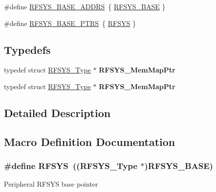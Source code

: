 \begin{DoxyCompactItemize}
\item 
\#define \hyperlink{group__RFSYS__Peripheral__Access__Layer_ga65742e072e59ddefb5bc976bbd6f517b}{R\+F\+S\+Y\+S\+\_\+\+B\+A\+S\+E\+\_\+\+A\+D\+D\+RS}~\{ \hyperlink{group__RFSYS__Peripheral__Access__Layer_ga742dcff49e1d900ccc5fb6d716dac969}{R\+F\+S\+Y\+S\+\_\+\+B\+A\+SE} \}
\item 
\#define \hyperlink{group__RFSYS__Peripheral__Access__Layer_ga59f6caa8732744ac3a9f91828ec2daa1}{R\+F\+S\+Y\+S\+\_\+\+B\+A\+S\+E\+\_\+\+P\+T\+RS}~\{ \hyperlink{group__RFSYS__Peripheral__Access__Layer_ga83a5a75f5421c69ce93437b8be3c1144}{R\+F\+S\+YS} \}
\end{DoxyCompactItemize}
\subsection*{Typedefs}
\begin{DoxyCompactItemize}
\item 
typedef struct \hyperlink{structRFSYS__Type}{R\+F\+S\+Y\+S\+\_\+\+Type} $\ast$ {\bfseries R\+F\+S\+Y\+S\+\_\+\+Mem\+Map\+Ptr}\hypertarget{group__RFSYS__Peripheral__Access__Layer_ga28fd539aaa87143571f3f1a237872673}{}\label{group__RFSYS__Peripheral__Access__Layer_ga28fd539aaa87143571f3f1a237872673}

\item 
typedef struct \hyperlink{structRFSYS__Type}{R\+F\+S\+Y\+S\+\_\+\+Type} $\ast$ {\bfseries R\+F\+S\+Y\+S\+\_\+\+Mem\+Map\+Ptr}\hypertarget{group__RFSYS__Peripheral__Access__Layer_ga28fd539aaa87143571f3f1a237872673}{}\label{group__RFSYS__Peripheral__Access__Layer_ga28fd539aaa87143571f3f1a237872673}

\end{DoxyCompactItemize}


\subsection{Detailed Description}


\subsection{Macro Definition Documentation}
\subsubsection[{\texorpdfstring{R\+F\+S\+YS}{RFSYS}}]{\setlength{\rightskip}{0pt plus 5cm}\#define R\+F\+S\+YS~(({\bf R\+F\+S\+Y\+S\+\_\+\+Type} $\ast$){\bf R\+F\+S\+Y\+S\+\_\+\+B\+A\+SE})}\hypertarget{group__RFSYS__Peripheral__Access__Layer_ga83a5a75f5421c69ce93437b8be3c1144}{}\label{group__RFSYS__Peripheral__Access__Layer_ga83a5a75f5421c69ce93437b8be3c1144}
Peripheral R\+F\+S\+YS base pointer 
